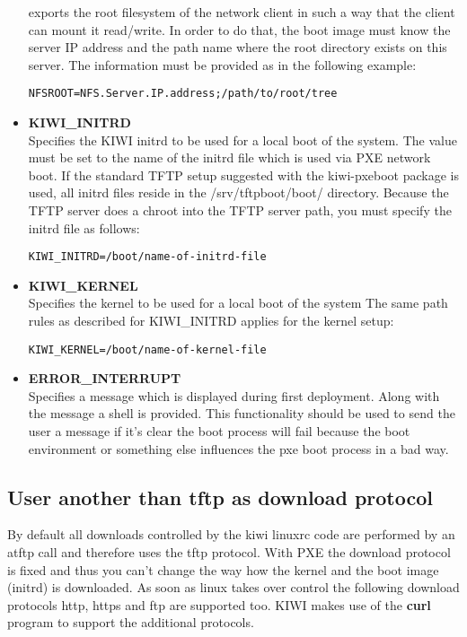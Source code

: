 \begin{itemize}
         exports the root filesystem of the network client in such a
         way that the client can mount it read/write. In order to do
         that, the boot image must know the server IP address and
         the path name where the root directory
         exists on this server. The information must be provided as
         in the following example:
\begin{verbatim}
NFSROOT=NFS.Server.IP.address;/path/to/root/tree
\end{verbatim}
    \item \textbf{KIWI\_INITRD}\\
         Specifies the KIWI initrd to be used for a local boot of the system.
         The value must be set to the name of the initrd file which is
         used via PXE network boot. If the standard TFTP setup suggested
         with the kiwi-pxeboot package is used, all initrd files reside
         in the /srv/tftpboot/boot/ directory. Because the TFTP server
         does a chroot into the TFTP server path, you must specify the
         initrd file as follows:
\begin{verbatim}
KIWI_INITRD=/boot/name-of-initrd-file
\end{verbatim}
    \item \textbf{KIWI\_KERNEL}\\
         Specifies the kernel to be used for a local boot of the system
         The same path rules as described for KIWI\_INITRD applies for
         the kernel setup:
\begin{verbatim}
KIWI_KERNEL=/boot/name-of-kernel-file
\end{verbatim}
	\item \textbf{ERROR\_INTERRUPT}\\
         Specifies a message which is displayed during first deployment.
         Along with the message a shell is provided. This functionality
         should be used to send the user a message if it's clear the
         boot process will fail because the boot environment or something
         else influences the pxe boot process in a bad way.
\end{itemize}

\subsection{User another than tftp as download protocol}

By default all downloads controlled by the kiwi linuxrc code
are performed by an atftp call and therefore uses the tftp
protocol. With PXE the download protocol is fixed and thus you
can't change the way how the kernel and the boot image (initrd)
is downloaded. As soon as linux takes over control the following
download protocols http, https and ftp are supported too.
KIWI makes use of the \textbf{curl} program to support the
additional protocols.

